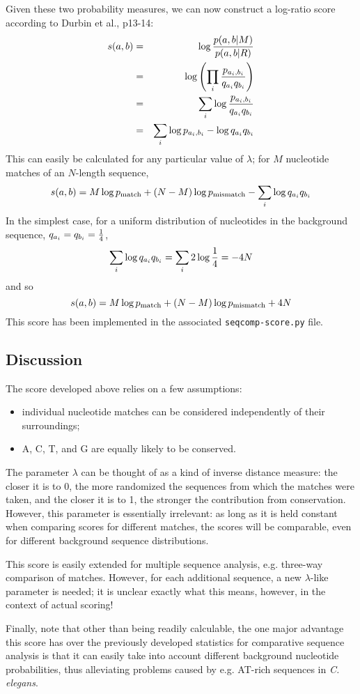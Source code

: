 Given these two probability measures, we can now construct a log-ratio
score according to Durbin et al., p13-14:
\begin{eqnarray*}
s(a,b) &=& \log { p(a,b | M) \over p(a,b | R)} \\
&=& \log \left(\prod_i { p_{a_i,b_i} \over q_{a_i} q_{b_i} }\right) \\
&=& \sum_i \log {p_{a_i,b_i} \over q_{a_i} q_{b_i} } \\
&=& \sum_i \log p_{a_i,b_i} - \log q_{a_i} q_{b_i}  \\
\end{eqnarray*}
This can easily be calculated for any particular value of $\lambda$;
for $M$ nucleotide matches of an $N$-length sequence,
\[
s(a,b) = M \log p_{\rm match} + (N - M) \log p_{\rm mismatch} -
\sum_{i} \log q_{a_i} q_{b_i}
\]
In the simplest case, for a uniform distribution of nucleotides in the
background sequence, $q_{a_i} = q_{b_i} = {1 \over 4}$,
\[
\sum_i \log q_{a_i} q_{b_i} = \sum_i 2 \log {1 \over 4} = -4 N
\]
and so
\[
s(a,b) = M \log p_{\rm match} + (N - M) \log p_{\rm mismatch} + 4N
\]
This score has been implemented in the associated {\tt seqcomp-score.py} file.

\subsection{Discussion}

The score developed above relies on a few assumptions:
\begin{itemize}
\item individual nucleotide matches can be considered independently of
their surroundings;
\item A, C, T, and G are equally likely to be conserved.
\end{itemize}

The parameter $\lambda$ can be thought of as a kind of inverse distance
measure: the closer it is to 0, the more randomized the sequences from
which the matches were taken, and the closer it is to 1, the stronger
the contribution from conservation.  However, this parameter is essentially
irrelevant: as long as it is held constant when comparing scores for
different matches, the scores will be comparable, even for different
background sequence distributions.

This score is easily extended for multiple sequence analysis, e.g.
three-way comparison of matches.  However, for each additional sequence, a
new $\lambda$-like parameter is needed; it is unclear exactly what this
means, however, in the context of actual scoring!

Finally, note that other than being readily calculable, the one major
advantage this score has over the previously developed statistics for
comparative sequence analysis is that it can easily take into account
different background nucleotide probabilities, thus alleviating problems
caused by e.g. AT-rich sequences in {\em C. elegans}.

